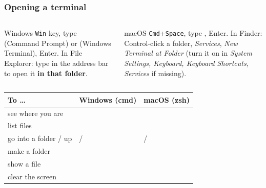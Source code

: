 \documentclass[aspectratio=169,10pt,compress]{beamer}
\begin{document}
\begin{frame}[t,fragile] \frametitle{Opening a terminal}
  \begin{columns}[T]
    \begin{column}{0.48\textwidth}
      \begin{block}{Windows}
        \small \texttt{Win} key, type  (Command Prompt) or  (Windows Terminal), Enter.
        In File Explorer: type  in the address bar to open it \textbf{in that folder}.
      \end{block}
    \end{column}
    \begin{column}{0.48\textwidth}
      \begin{block}{macOS}
        \small \texttt{Cmd}+\texttt{Space}, type , Enter.
        In Finder: Control-click a folder, \emph{Services}, \emph{New Terminal at Folder} (turn it on in
        \emph{System Settings, Keyboard, Keyboard Shortcuts, Services} if missing).
      \end{block}
    \end{column}
  \end{columns}
  \vspace{0.3em}
  \footnotesize
  \begin{tabular}{@{}L{0.3\textwidth}L{0.3\textwidth}L{0.3\textwidth}@{}}
    \toprule
    \textbf{To \dots}                 & \textbf{Windows (cmd)}        & \textbf{macOS (zsh)} \\
    \midrule
    see where you are                 &                    &  \\
    list files                        &                   &  \\
    go into a folder / up             &  /  &  /  \\
    make a folder                     &           &  \\
    show a file                       &       &  \\
    clear the screen                  &                   &  \\
    \bottomrule
  \end{tabular}
\end{frame}
\end{document}
